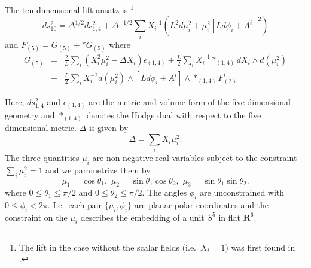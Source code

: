 \documentclass[a4paper,12pt]{article}
\begin{document}
The ten dimensional lift ansatz is \cite{Cvetic:1999xp}
\footnote{The lift in the case without the scalar fields (i.e.\ $X_i = 1$) was
first found in \cite{Chamblin:1999tk}.}:
\begin{equation}
\label{metricansatz}
ds_{10}^2 = \Delta^{1/2} ds_{1,4}^2   + \Delta^{-1/2} \sum_i X_i^{-1} (L^2 d \mu_i ^2 + \mu_i ^2[L d \phi_i + A^i]^2 ) 
\end{equation}
and $F_{(5)} = G_{(5)} + *G_{(5)}$ where
\begin{eqnarray}
 G_{(5)} &=& \frac{2}{L}  \sum_i (X_i^{2}  \mu_i ^2 -  \Delta X_i) \epsilon_{(1,4)} + \frac{L}{2} \sum_i  X_i^{-1} *_{(1,4)} d X_i \wedge d(\mu_i^{2}) \nonumber \\
& +& \frac{L}{2}  \sum_i  X_i^{-2}  d(\mu_i^{2}) \wedge [L d\phi_i + A^i] \wedge *_{(1,4)} F^i_{(2)}
\label{5form}
\end{eqnarray}

Here, $ds_{1,4}^2$ and $ \epsilon_{(1,4)}$ are the metric and volume form of the five dimensional geometry and $*_{(1,4)}$ denotes the Hodge dual with respect to the five dimensional metric.  $\Delta$ is given by 
\begin{equation}
\Delta =  \sum_i X_i \mu_i ^2 .
\end{equation}
The three quantities $\mu_i$ are non-negative real variables subject to the
constraint $\sum_i \mu_i ^2 = 1$ and we  parametrize them by
\begin{equation}
\mu_1 = \cos \theta_1 , \, \, \mu_2 = \sin \theta_1 \cos \theta_2 , \, \, \mu_3 = \sin \theta_1 \sin \theta_2 .
\label{mu_theta}
\end{equation}
where $0 \le \theta_1 \le \pi/2$ and $0 \le \theta_2 \le \pi/2$. The angles
$\phi_i$ are unconstrained with $0 \le \phi_i < 2\pi$. I.e.\ each pair
$\{\mu_i, \phi_i\}$ are planar polar coordinates and the constraint on the
$\mu_i$ describes the embedding of a unit $S^5$ in flat $\mathbf{R}^6$.
\end{document}
